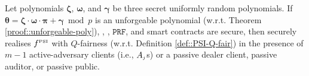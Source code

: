  \begin{theorem}\label{theorem::F-PSI-security}
Let polynomials $\bm\zeta$, $\bm\omega$, and $\bm\gamma$ be three secret uniformly random polynomials. If  $\bm\theta=\bm\zeta\cdot \bm\omega\cdot\bm \pi+\bm \gamma \bmod p$ is an unforgeable polynomial (w.r.t. Theorem \ref{proof::unforgeable-poly}), \zspaa, \vopr,  $\mathtt{PRF}$, and smart contracts are secure, then \fpsi securely realises  $f^{\scriptscriptstyle \text{PSI}}$ with $Q$-fairness (w.r.t. Definition \ref{def::PSI-Q-fair}) in the presence of $m-1$  active-adversary clients (i.e., $A_{\scriptscriptstyle j}$s) or a passive dealer client, passive auditor, or passive public. 
 \end{theorem}
 






 
 
 